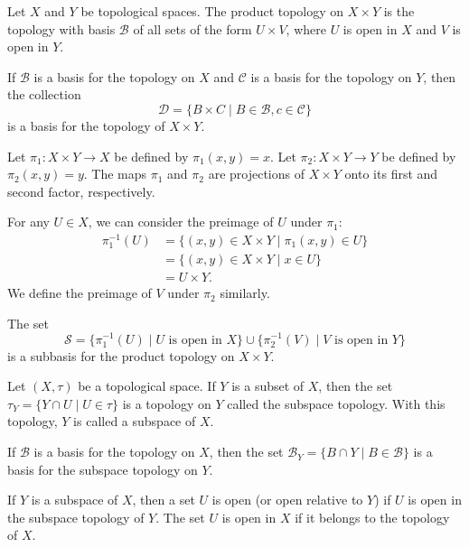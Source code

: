 \documentclass{article}
\newcommand{\inv}{^{-1}}
\newcommand{\B}{\mathcal B}
\begin{document}
\medskip{}

    Let $X$ and $Y$ be topological spaces. The product topology on $X \times Y$ is the topology with basis $\B$ of all sets of the form $U \times V$, where $U$ is open in $X$ and $V$ is open in $Y$.

\medskip{}

    If $\B$ is a basis for the topology on $X$ and $\mathcal C$ is a basis for the topology on $Y$, then the collection $$\mathcal D = \{B \times C \mid B \in \B, c \in \mathcal C\}$$ is a basis for the topology of $X \times Y$.

\medskip{}

    Let $\pi_1: X \times Y \to X$ be defined by $\pi_1(x,y) = x$.
    Let $\pi_2: X \times Y \to Y$ be defined by $\pi_2(x,y) = y$.
    The maps $\pi_1$ and $\pi_2$ are projections of $X \times Y$ onto its first and second factor, respectively.

    For any $U \in X$, we can consider the preimage of $U$ under $\pi_1$:
    \begin{align*}
        \pi_1\inv(U) &= \{(x,y) \in X \times Y \mid \pi_1(x,y) \in U\} \\
                     &= \{(x,y) \in X \times Y \mid x \in U\} \\
                     &= U \times Y.
    \end{align*}
    We define the preimage of $V$ under $\pi_2$ similarly.

\medskip{}

    The set $$\mathcal S = \{\pi_1\inv(U) \mid U \text{ is open in } X\} \cup \{\pi_2\inv(V) \mid V \text{ is open in } Y\}$$ is a subbasis for the product topology on $X \times Y$.

\medskip{}

    Let $(X,\tau)$ be a topological space. If $Y$ is a subset of $X$, then the set $\tau_Y = \{Y \cap U \mid U \in \tau\}$ is a topology on $Y$ called the subspace topology. With this topology, $Y$ is called a subspace of $X$.

\medskip{}

    If $\B$ is a basis for the topology on $X$, then the set $\B_Y = \{B \cap Y \mid B \in \B\}$ is a basis for the subspace topology on $Y$.

\medskip{}

    If $Y$ is a subspace of $X$, then a set $U$ is open (or open relative to $Y$) if $U$ is open in the subspace topology of $Y$. The set $U$ is open in $X$ if it belongs to the topology of $X$.
\end{document}

